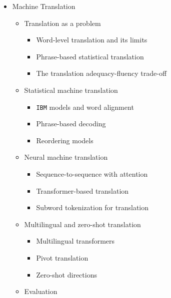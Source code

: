 \documentclass[
]{article}
\providecommand{\tightlist}{%
  \setlength{\itemsep}{0pt}\setlength{\parskip}{0pt}}
\begin{document}
\begin{itemize}
\begin{itemize}
    \begin{itemize}
    \tightlist
    \item
      Natural language inference
    \item
      Entailment, contradiction, neutrality
    \item
      Datasets and challenges
    \end{itemize}
  \end{itemize}
\item
  Machine Translation

  \begin{itemize}
  \tightlist
  \item
    Translation as a problem

    \begin{itemize}
    \tightlist
    \item
      Word-level translation and its limits
    \item
      Phrase-based statistical translation
    \item
      The translation adequacy-fluency trade-off
    \end{itemize}
  \item
    Statistical machine translation

    \begin{itemize}
    \tightlist
    \item
      \texttt{IBM} models and word alignment
    \item
      Phrase-based decoding
    \item
      Reordering models
    \end{itemize}
  \item
    Neural machine translation

    \begin{itemize}
    \tightlist
    \item
      Sequence-to-sequence with attention
    \item
      Transformer-based translation
    \item
      Subword tokenization for translation
    \end{itemize}
  \item
    Multilingual and zero-shot translation

    \begin{itemize}
    \tightlist
    \item
      Multilingual transformers
    \item
      Pivot translation
    \item
      Zero-shot directions
    \end{itemize}
  \item
    Evaluation


\end{itemize}
\end{itemize}
\end{document}
